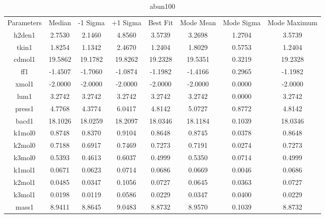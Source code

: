 \begin{table}
\caption{abun100}
\begin{tabular}{cccccccc}
Parameters & Median & -1 Sigma & +1 Sigma & Best Fit & Mode Mean & Mode Sigma & Mode Maximum \\
h2den1 & 2.7530 & 2.1460 & 4.8560 & 3.5739 & 3.2698 & 1.2704 & 3.5739 \\
tkin1 & 1.8254 & 1.1342 & 2.4670 & 1.2404 & 1.8029 & 0.5753 & 1.2404 \\
cdmol1 & 19.5862 & 19.1782 & 19.8262 & 19.2328 & 19.5351 & 0.3219 & 19.2328 \\
ff1 & -1.4507 & -1.7060 & -1.0874 & -1.1982 & -1.4166 & 0.2965 & -1.1982 \\
xmol1 & -2.0000 & -2.0000 & -2.0000 & -2.0000 & -2.0000 & 0.0000 & -2.0000 \\
lum1 & 3.2742 & 3.2742 & 3.2742 & 3.2742 & 3.2742 & 0.0000 & 3.2742 \\
press1 & 4.7768 & 4.3774 & 6.0417 & 4.8142 & 5.0727 & 0.8772 & 4.8142 \\
bacd1 & 18.1026 & 18.0259 & 18.2097 & 18.0346 & 18.1184 & 0.1039 & 18.0346 \\
k1mol0 & 0.8748 & 0.8370 & 0.9104 & 0.8648 & 0.8745 & 0.0378 & 0.8648 \\
k2mol0 & 0.7188 & 0.6917 & 0.7469 & 0.7273 & 0.7191 & 0.0274 & 0.7273 \\
k3mol0 & 0.5393 & 0.4613 & 0.6037 & 0.4999 & 0.5350 & 0.0714 & 0.4999 \\
k1mol1 & 0.0671 & 0.0623 & 0.0714 & 0.0686 & 0.0669 & 0.0046 & 0.0686 \\
k2mol1 & 0.0485 & 0.0347 & 0.1056 & 0.0727 & 0.0645 & 0.0363 & 0.0727 \\
k3mol1 & 0.0198 & 0.0119 & 0.0586 & 0.0229 & 0.0347 & 0.0400 & 0.0229 \\
mass1 & 8.9411 & 8.8645 & 9.0483 & 8.8732 & 8.9570 & 0.1039 & 8.8732 \\
\end{tabular}
\end{table}
